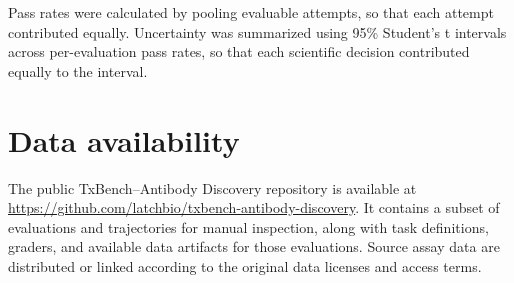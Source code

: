 \documentclass[10pt,letterpaper]{article}
\begin{document}
Pass rates were calculated by pooling evaluable attempts, so that each attempt contributed equally. Uncertainty was summarized using 95\% Student's t intervals across per-evaluation pass rates, so that each scientific decision contributed equally to the interval.

\section*{Data availability}

The public TxBench--Antibody Discovery repository is available at
\url{https://github.com/latchbio/txbench-antibody-discovery}. It contains a subset of
evaluations and trajectories for manual inspection, along with task definitions,
graders, and available data artifacts for those evaluations. Source assay data
are distributed or linked according to the original data licenses and access
terms.


\EndBody
\end{document}
